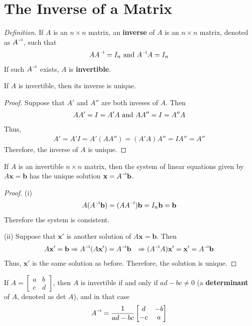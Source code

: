 \section{The Inverse of a Matrix}
\textit{Definition.} If $A$ is an $n \times n$ matrix, an \textbf{inverse} of $A$ is an $n \times n$ matrix, denoted as $\inv{A}$, such that
\begin{align*}
A\inv{A} = I_n \textnormal{ and } \inv{A}A = I_n
\end{align*} If such $\inv{A}$ exists, $A$ is \textbf{invertible}.

\begin{theorem}
	If $A$ is invertible, then its inverse is unique.
\end{theorem}

\begin{proof}
	Suppose that $A'$ and $A''$ are both inveses of $A$. Then
	\begin{align*}
	AA' = I = A'A \textnormal{ and } AA'' = I = A''A
	\end{align*}
	Thus, \begin{align*}
	A' = A'I = A'(AA'') = (A'A)A'' = IA'' = A''
	\end{align*} Therefore, the inverse of $A$ is unique.
\end{proof}

\begin{theorem}
	If $A$ is an invertible $n \times n$ matrix, then the system of linear equations given by $A\textbf{x} =\textbf{b}$ has the unique solution $\textbf{x} = \inv{A}\textbf{b}$.
\end{theorem}

\begin{proof}
	(i) \begin{align*}
	A(\inv{A}\textbf{b}) = (A\inv{A})\textbf{b} = I_n\textbf{b} = \textbf{b}
	\end{align*} Therefore the system is consistent.
	
	\noindent (ii) Suppose that $\textbf{x}'$ is another solution of $A\textbf{x} = \textbf{b}$. Then
	\begin{align*}
	A\textbf{x}' = \textbf{b} & \Rightarrow \inv{A}(A\textbf{x}') = \inv{A}\textbf{b}
	& \Rightarrow (\inv{A}A)\textbf{x}' = \textbf{x}' = \inv{A}\textbf{b}
	\end{align*} Thus, $\textbf{x}'$ is the same solution as before. Therefore, the solution is unique.
\end{proof}

\begin{theorem}
	If $A = \begin{bmatrix}
	a & b \\ c & d
	\end{bmatrix}$, then $A$ is invertible if and only if $ad - bc \neq 0$ (a \textbf{determinant} of $A$, denoted as det $A$), and in that case \begin{align*}
	\inv{A} = \frac{1}{ad-bc}\begin{bmatrix}
	d & -b \\ -c & a
	\end{bmatrix}
	\end{align*}
\end{theorem}

